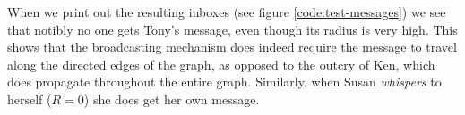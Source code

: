 
When we print out the resulting inboxes (see figure \ref{code:test-messages})
we see that notibly no one gets Tony's message, even though its radius is very
high. This shows that the broadcasting mechanism does indeed require the
message to travel along the directed edges of the graph, as opposed to the
outcry of Ken, which does propagate throughout the entire graph. Similarly,
when Susan {\it whispers} to herself ($R=0$) she does get her own message.


